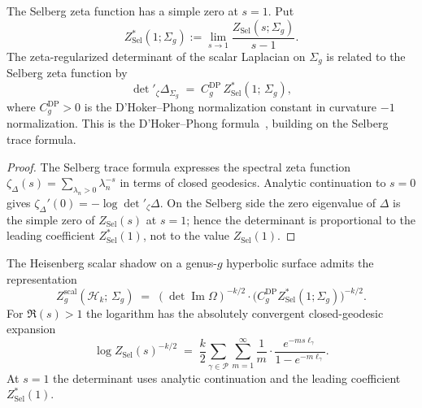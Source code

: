 \begin{theorem}
\label{thm:thqg-I-determinant-formula}
The Selberg zeta function has a simple zero at $s=1$. Put
\[
Z_{\mathrm{Sel}}^*(1;\Sigma_g)
:=
\lim_{s\to 1}\frac{Z_{\mathrm{Sel}}(s;\Sigma_g)}{s-1}.
\]
The zeta-regularized determinant of the scalar Laplacian on $\Sigma_g$
is related to the Selberg zeta function by
\begin{equation}%
\det{}'_\zeta \Delta_{\Sigma_g}
\;=\;
C_g^{\mathrm{DP}}\,
Z_{\mathrm{Sel}}^*(1;\,\Sigma_g),
\end{equation}
where $C_g^{\mathrm{DP}}>0$ is the D'Hoker--Phong normalization
constant in curvature $-1$ normalization.
This is the D'Hoker--Phong formula~\cite{DP86}, building on the Selberg trace formula.
\end{theorem}

\begin{proof}
The Selberg trace formula expresses the spectral zeta function
$\zeta_\Delta(s) = \sum_{\lambda_n > 0} \lambda_n^{-s}$ in terms of
closed geodesics. Analytic continuation to $s=0$ gives
$\zeta_\Delta'(0)=-\log\det{}'_\zeta\Delta$. On the Selberg side the
zero eigenvalue of $\Delta$ is the simple zero of
$Z_{\mathrm{Sel}}(s)$ at $s=1$; hence the determinant is proportional
to the leading coefficient $Z_{\mathrm{Sel}}^*(1)$, not to the value
$Z_{\mathrm{Sel}}(1)$.
\end{proof}

\begin{corollary}
\label{cor:thqg-I-heisenberg-selberg}
The Heisenberg scalar shadow on a genus-$g$ hyperbolic surface admits
the representation
\begin{equation}%
Z_g^{\mathrm{scal}}(\mathcal{H}_k;\,\Sigma_g)
\;=\;
(\det\operatorname{Im}\Omega)^{-k/2}
\cdot
\bigl(C_g^{\mathrm{DP}}Z_{\mathrm{Sel}}^*(1;\Sigma_g)\bigr)^{-k/2}.
\end{equation}
For $\Re(s)>1$ the logarithm has the absolutely convergent
closed-geodesic expansion
\begin{equation}%
\log Z_{\mathrm{Sel}}(s)^{-k/2}
\;=\;
\frac{k}{2} \sum_{\gamma \in \mathcal{P}} \sum_{m=1}^{\infty}
\frac{1}{m}\cdot
\frac{e^{-ms\ell_\gamma}}{1-e^{-m\ell_\gamma}} .
\end{equation}
At $s=1$ the determinant uses analytic continuation and the leading
coefficient $Z_{\mathrm{Sel}}^*(1)$.
\end{corollary}

